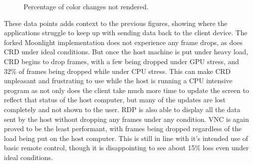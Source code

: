\begin{figure}[t]
  \centering
  \caption[Color Delay Loss Data]{Percentage of color changes not rendered.}
  \label{fig:ColorDelayLoss}
\end{figure}

These data points adds context to the previous figures, showing where the applications struggle to keep up with sending data back to the client device.
The forked Moonlight implementation does not experience any frame drops, as does CRD under ideal conditions.
But once the host machine is put under heavy load, CRD begins to drop frames, with a few being dropped under GPU stress, and 32\% of frames being dropped while under CPU stress.
This can make CRD unpleasant and frustrating to use while the host is running a CPU intensive program as not only does the client take much more time to update the screen to reflect that status of the host computer, but many of the updates are lost completely and not shown to the user.
RDP is also able to display all the data sent by the host without dropping any frames under any condition.
VNC is again proved to be the least performant, with frames being dropped regardless of the load being put on the host computer.
This is still in line with it's intended use of basic remote control, though it is disappointing to see about 15\% loss even under ideal conditions.



